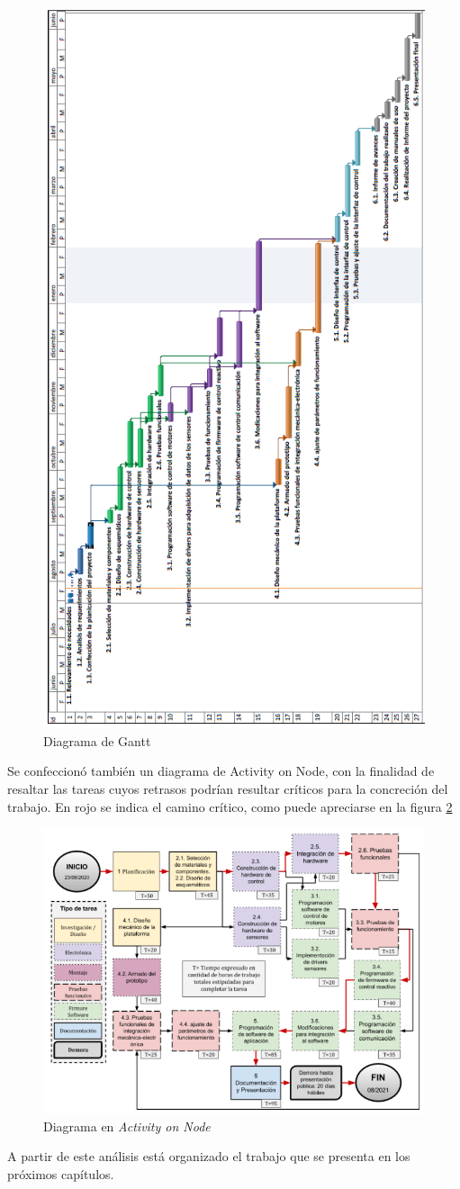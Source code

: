 \begin{figure}[htpb]
\centering 
\includegraphics[width=.8\textwidth]{./Figures/Gantt.PNG}
\caption{Diagrama de Gantt}
\label{fig:gantt2}
\end{figure}

\pagebreak

Se confeccionó también un diagrama de Activity on Node, con la finalidad de resaltar las tareas cuyos retrasos podrían resultar críticos para la concreción del trabajo. En rojo se indica el camino crítico, como puede apreciarse en la figura \ref{fig:AoN}

\begin{figure}[htpb]
\centering 
\includegraphics[width=.8\textwidth]{./Figures/AoN.png}
\caption{Diagrama en \textit{Activity on Node}}
\label{fig:AoN}
\end{figure}


A partir de este análisis está organizado el trabajo que se presenta en los próximos capítulos.

